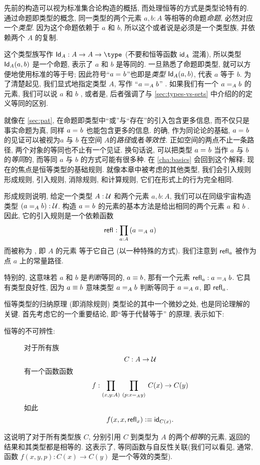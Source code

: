 %
%
%
%
先前的构造可以视为标准集合论构造的概括, 而处理恒等的方式是类型论特有的.
通过命题即类型的概念, 同一类型的两个元素 $a,b:A$ 等相等的命题\emph{命题}, 必然对应一个\emph{类型}.
因为这个命题依赖于 $a$ 和 $b$, 所以这个或者说是必须是一个类型族, 并依赖两个 $A$ 的复制.

这个类型族写作 $\idtypevar{A}:A\to A\to\type$ (不要和恒等函数 $\idfunc[A]$ 混淆), 所以类型 $\idtype[A]ab$ 是一个命题, 表示了 $a$ 和 $b$ 是等同的. 一旦熟悉了命题即类型, 就可以方便地使用标准的等于号; 因此符号``$\id{a}{b}$''也即是\emph{类型} $\idtype[A]ab$, 代表 $a$ 等于 $b$. 为了清楚起见, 我们显式地指定类型 $A$, 写作 ``$\id[A]{a}{b}$''  . 如果我们有一个 $\id[A]{a}{b}$ 的元素, 我们可以说 $a$ 和 $b$ , 或者是, 后者强调了与 \cref{sec:types-vs-sets} 中介绍的的定义等同的区别. %
%

就像在 \cref{sec:pat}, 在命题即类型中``或''与``存在''的引入包含更多信息, 而不仅只是事实命题为真, 同样 $\id{a}{b}$ 也能包含更多的信息. 的确, 作为同论论的基础, $\id{a}{b}$ 的见证可以被视为$a$ 与 $b$ 在空间 $A$的\emph{路径}或者\emph{等效性}. 正如空间的两点不止一条路径, 两个对象的等同也不止有一个见证. 换句话说, 可以把类型 $\id{a}{b}$ 当作 $a$ 与 $b$ 的\emph{等同}的, 而等同 $a$ 与 $b$ 的方式可能有很多种. 在 \cref{cha:basics} 会回到这个解释; 现在的焦点是恒等类型的基础规则. 就像本章中被考虑的其他类型, 我们会引入规则形成规则, 引入规则, 消除规则, 和计算规则, 它们在形式上的行为完全相同. 

形成规则说明, 给定一个类型 $A:\UU$ 和两个元素 $a,b:A$, 我们可以在同级宇宙构造类型 $(\id[A]{a}{b}):\UU$. 构造 $\id{a}{b}$ 的元素的基本方法是给出相同的两个元素 $a$ 和 $b$ . 因此, 它的引入规则是一个依赖函数 \[\refl{} : \prd{a:A} (\id[A]{a}{a})\]
而被称为 , %
即 $A$ 的元素  等于它自己 (以一种特殊的方式). 我们注意到 $\refl{a}$ 被作为 点 $a$ 上的常量路径. 

特别的, 这意味若 $a$ 和 $b$ 是\emph{判断}等同的, $a\jdeq b$, 那有一个元素 $\refl{a} : \id[A]{a}{b}$. 它具有类型良好性, 因为 $a\jdeq b$ 意味类型 $\id[A]{a}{b}$ 判断等同于 $\id[A]{a}{a}$, 即 $\refl{a}$. 

恒等类型的归纳原理 (即消除规则) 类型论的其中一个微妙之处, 也是同论理解的关键. 首先考虑它的一个重要结论, 即``等于代替等于'' 的原理, 表示如下: %
%
\begin{description}
\item[恒等的不可辨性:]
对于所有族  \[
C : A \to \UU \]
有一个函数函数 \[
f : \prd{x,y:A}{p:\id[A] x y} C(x) \to C(y) \]
如此 \[
f(x,x,\refl{x}) \defeq \idfunc[C(x)]. \]
\end{description}
这说明了对于所有类型族 $C$, 分别引用 $C$ 到类型为  $A$ 的两个\emph{相等}的元素, 返回的结果和其类型都是相等的. 这表示了, 等同函数与自反性关联(我们可以看见, 通常, 函数 $f(x,y,p): C(x) \to C(y)$ 是一个等效的类型). 

